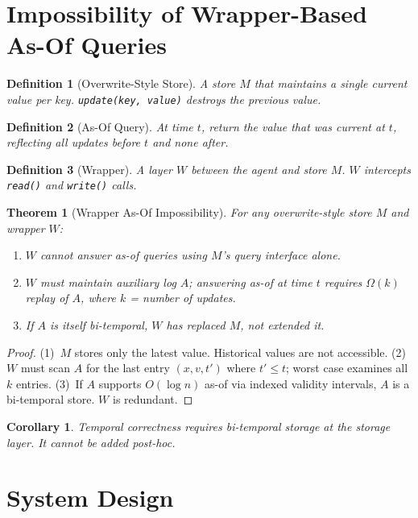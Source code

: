 \documentclass{article}
\newtheorem{theorem}{Theorem}
\newtheorem{definition}{Definition}
\newtheorem{corollary}{Corollary}
\begin{document}
\section{Impossibility of Wrapper-Based As-Of Queries}
\label{sec:theory}

\begin{definition}[Overwrite-Style Store]
A store $M$ that maintains a single current value per key. \texttt{update(key, value)} destroys the previous value.
\end{definition}

\begin{definition}[As-Of Query]
At time $t$, return the value that was current at $t$, reflecting all updates before $t$ and none after.
\end{definition}

\begin{definition}[Wrapper]
A layer $W$ between the agent and store $M$. $W$ intercepts \texttt{read()} and \texttt{write()} calls.
\end{definition}

\begin{theorem}[Wrapper As-Of Impossibility]
\label{thm:impossibility}
For any overwrite-style store $M$ and wrapper $W$:
\begin{enumerate}
\item $W$ cannot answer as-of queries using $M$'s query interface alone.
\item $W$ must maintain auxiliary log $A$; answering as-of at time $t$ requires $\Omega(k)$ replay of $A$, where $k$ = number of updates.
\item If $A$ is itself bi-temporal, $W$ has replaced $M$, not extended it.
\end{enumerate}
\end{theorem}

\begin{proof}
(1)~$M$ stores only the latest value. Historical values are not accessible.
(2)~$W$ must scan $A$ for the last entry $(x, v, t')$ where $t' \leq t$; worst case examines all $k$ entries.
(3)~If $A$ supports $O(\log n)$ as-of via indexed validity intervals, $A$ is a bi-temporal store. $W$ is redundant.
\end{proof}

\begin{corollary}
Temporal correctness requires bi-temporal storage at the storage layer. It cannot be added post-hoc.
\end{corollary}

\section{System Design}
\label{sec:design}
\end{document}
